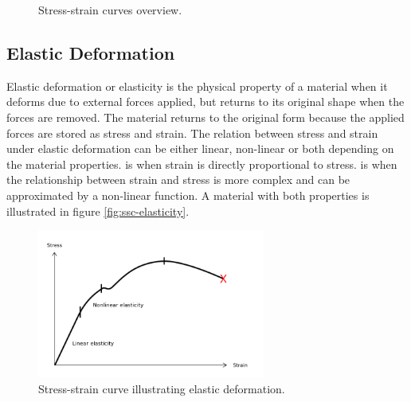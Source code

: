 \begin{figure}
  \centering
  \caption{Stress-strain curves overview.}
  \label{fig:stress-starin-overview}
\end{figure}

\subsection{Elastic Deformation}
\label{sec:elastic-deformation}
Elastic deformation or elasticity is the physical property of a
material when it deforms due to external forces applied, but returns to its
original shape when the forces are removed. The material returns to
the original form because the applied forces are stored as
stress and strain. The relation between stress and strain under
elastic deformation can be either linear, non-linear or both depending
on the material properties.  is when strain
is directly proportional to stress.  is
when the relationship between strain and stress is more complex and
can be approximated by a non-linear function. A material with both
properties is illustrated in figure \vref{fig:ssc-elasticity}.

\begin{figure}
  \centering
  \includegraphics[width=7.5cm]{./images/physics_ssc_elasticity.png}
\caption{Stress-strain curve illustrating elastic deformation.}
\label{fig:ssc-elasticity}
\end{figure}

